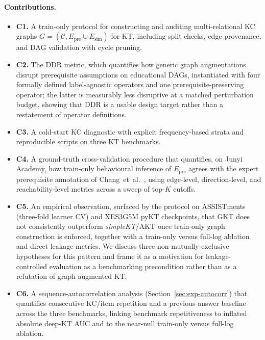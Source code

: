 \documentclass[runningheads]{llncs}
\newcommand{\Epre}{\ensuremath{E_{\text{pre}}}}
\newcommand{\Esim}{\ensuremath{E_{\text{sim}}}}
\newcommand{\DDR}{\textsc{DDR}}
\begin{document}
\paragraph{Contributions.}
\begin{itemize}
  \item \textbf{C1.} A train-only protocol for constructing and auditing
  multi-relational KC graphs
  $G=(\mathcal{C}, \Epre \cup \Esim)$ for KT, including split checks,
  edge provenance, and DAG validation with cycle pruning.
  \item \textbf{C2.} The \DDR{} metric, which quantifies how generic
  graph augmentations disrupt prerequisite assumptions on educational
  DAGs, instantiated with four formally defined label-agnostic operators
  and one prerequisite-preserving operator; the latter is measurably less
  disruptive at a matched perturbation budget, showing that \DDR{} is a
  usable design target rather than a restatement of operator definitions.
  \item \textbf{C3.} A cold-start KC diagnostic with explicit
  frequency-based strata and reproducible scripts on three KT
  benchmarks.
  \item \textbf{C4.} A ground-truth cross-validation procedure that
  quantifies, on Junyi Academy, how train-only behavioural inference of
  $\Epre$ agrees with the expert prerequisite annotation of
  Chang~et~al.~\cite{junyi_dataset}, using edge-level, direction-level,
  and reachability-level metrics across a sweep of top-$K$ cutoffs.
  \item \textbf{C5.} An empirical observation, surfaced by the protocol
  on ASSISTments (three-fold learner CV) and XES3G5M pyKT checkpoints, that GKT does not
  consistently outperform \textit{simpleKT}/AKT once train-only graph
  construction is enforced, together with a train-only versus full-log
  ablation and direct leakage metrics. We discuss three
  non-mutually-exclusive hypotheses for this pattern and frame it as a
  motivation for leakage-controlled evaluation as a benchmarking
  precondition rather than as a refutation of graph-augmented KT.
  \item \textbf{C6.} A sequence-autocorrelation analysis
  (Section~\ref{sec:exp-autocorr}) that quantifies consecutive KC/item
  repetition and a previous-answer baseline across the three benchmarks,
  linking benchmark repetitiveness to inflated absolute deep-KT AUC and
  to the near-null train-only versus full-log ablation.
\end{itemize}
\end{document}
